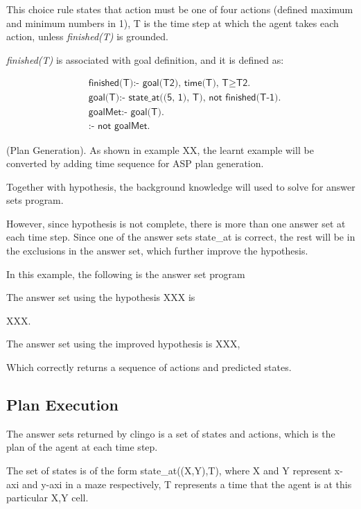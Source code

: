 This choice rule states that action must be one of four actions (defined maximum and minimum numbers in 1),
T is the time step at which the agent takes each action, unless \textit{finished(T)} is grounded.

\textit{finished(T)} is associated with goal definition, and it is defined as:

\begin{equation}
\begin{split}
&\textsf{finished(T):- goal(T2), time(T), T} \geq \textsf{T2.}\\
&\textsf{goal(T):- state\_at((5, 1), T), not finished(T-1).}\\
&\textsf{goalMet:- goal(T).}\\
&\textsf{:- not goalMet.}
\end{split}
\end{equation}

\begin{examp} \normalfont (Plan Generation).
As shown in example XX, the learnt example will be converted by adding time sequence for ASP plan generation.

Together with hypothesis, the background knowledge will used to solve for answer sets program. 

However, since hypothesis is not complete, there is more than one answer set at each time step. Since one of the answer sets state\_at is correct, the rest will be in the exclusions in the answer set, 
which further improve the hypothesis.


In this example, the following is the answer set program

The answer set using the hypothesis XXX is 

XXX. 

The answer set using the improved hypothesis is XXX, 

Which correctly returns a sequence of actions and predicted states. 

\end{examp}

\subsection{Plan Execution}
\label{subsec:plan_execution}

The answer sets returned by clingo is a set of states and actions, which is the plan of the agent at each time step.

The set of states is of the form state\_at((X,Y),T), where X and Y represent x-axi and y-axi in a maze respectively, T represents a time that the agent is at
this particular X,Y cell.

